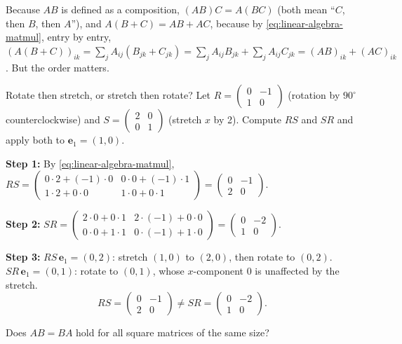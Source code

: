 Because $AB$ is defined as a composition, $(AB)C=A(BC)$ (both mean ``$C$, then $B$, then $A$''), and $A(B+C)=AB+AC$, because by \cref{eq:linear-algebra-matmul}, entry by entry, $(A(B+C))_{ik}=\sum_jA_{ij}(B_{jk}+C_{jk})=\sum_jA_{ij}B_{jk}+\sum_jA_{ij}C_{jk}=(AB)_{ik}+(AC)_{ik}$. But the order matters.

\begin{sample}{Rotate then stretch, or stretch then rotate?}
Let $R=\begin{pmatrix}0&-1\\1&0\end{pmatrix}$ (rotation by $90^\circ$ counterclockwise) and $S=\begin{pmatrix}2&0\\0&1\end{pmatrix}$ (stretch $x$ by 2). Compute $RS$ and $SR$ and apply both to $\bm e_1=(1,0)$.

\textbf{Step 1:} By \cref{eq:linear-algebra-matmul}, $RS=\begin{pmatrix}0\cdot2+(-1)\cdot0&0\cdot0+(-1)\cdot1\\1\cdot2+0\cdot0&1\cdot0+0\cdot1\end{pmatrix}=\begin{pmatrix}0&-1\\2&0\end{pmatrix}$.

\textbf{Step 2:} $SR=\begin{pmatrix}2\cdot0+0\cdot1&2\cdot(-1)+0\cdot0\\0\cdot0+1\cdot1&0\cdot(-1)+1\cdot0\end{pmatrix}=\begin{pmatrix}0&-2\\1&0\end{pmatrix}$.

\textbf{Step 3:} $RS\,\bm e_1=(0,2)$: stretch $(1,0)$ to $(2,0)$, then rotate to $(0,2)$. $SR\,\bm e_1=(0,1)$: rotate to $(0,1)$, whose $x$-component $0$ is unaffected by the stretch.
\[
\boxed{RS=\begin{pmatrix}0&-1\\2&0\end{pmatrix}\neq SR=\begin{pmatrix}0&-2\\1&0\end{pmatrix}.}
\]
\end{sample}

\begin{checkpoint}
Does $AB=BA$ hold for all square matrices of the same size?
\end{checkpoint}

